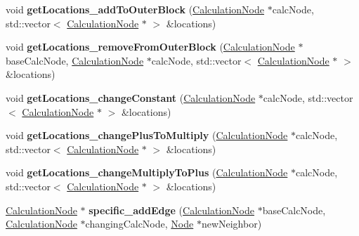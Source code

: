 \begin{DoxyCompactItemize}
\item 
void {\bfseries get\+Locations\+\_\+add\+To\+Outer\+Block} (\hyperlink{classCalculationNode}{Calculation\+Node} $\ast$calc\+Node, std\+::vector$<$ \hyperlink{classCalculationNode}{Calculation\+Node} $\ast$ $>$ \&locations)\hypertarget{classNetworkModifier_ac082b11da7cb452b9047eea94b0f1e37}{}\label{classNetworkModifier_ac082b11da7cb452b9047eea94b0f1e37}

\item 
void {\bfseries get\+Locations\+\_\+remove\+From\+Outer\+Block} (\hyperlink{classCalculationNode}{Calculation\+Node} $\ast$base\+Calc\+Node, \hyperlink{classCalculationNode}{Calculation\+Node} $\ast$calc\+Node, std\+::vector$<$ \hyperlink{classCalculationNode}{Calculation\+Node} $\ast$ $>$ \&locations)\hypertarget{classNetworkModifier_afe88d2366b6e5464b3e29a19fa1eeb1e}{}\label{classNetworkModifier_afe88d2366b6e5464b3e29a19fa1eeb1e}

\item 
void {\bfseries get\+Locations\+\_\+change\+Constant} (\hyperlink{classCalculationNode}{Calculation\+Node} $\ast$calc\+Node, std\+::vector$<$ \hyperlink{classCalculationNode}{Calculation\+Node} $\ast$ $>$ \&locations)\hypertarget{classNetworkModifier_a92f84a858a92dcd68e4ea252ea65f5a0}{}\label{classNetworkModifier_a92f84a858a92dcd68e4ea252ea65f5a0}

\item 
void {\bfseries get\+Locations\+\_\+change\+Plus\+To\+Multiply} (\hyperlink{classCalculationNode}{Calculation\+Node} $\ast$calc\+Node, std\+::vector$<$ \hyperlink{classCalculationNode}{Calculation\+Node} $\ast$ $>$ \&locations)\hypertarget{classNetworkModifier_a610cc380e39e047cdd2f716c75a657df}{}\label{classNetworkModifier_a610cc380e39e047cdd2f716c75a657df}

\item 
void {\bfseries get\+Locations\+\_\+change\+Multiply\+To\+Plus} (\hyperlink{classCalculationNode}{Calculation\+Node} $\ast$calc\+Node, std\+::vector$<$ \hyperlink{classCalculationNode}{Calculation\+Node} $\ast$ $>$ \&locations)\hypertarget{classNetworkModifier_ac396b8a961cd134496feb28b04f4a2ff}{}\label{classNetworkModifier_ac396b8a961cd134496feb28b04f4a2ff}

\item 
\hyperlink{classCalculationNode}{Calculation\+Node} $\ast$ {\bfseries specific\+\_\+add\+Edge} (\hyperlink{classCalculationNode}{Calculation\+Node} $\ast$base\+Calc\+Node, \hyperlink{classCalculationNode}{Calculation\+Node} $\ast$changing\+Calc\+Node, \hyperlink{classNode}{Node} $\ast$new\+Neighbor)\hypertarget{classNetworkModifier_a3e37a7d3d65e0162f2713da90a4a816a}{}\label{classNetworkModifier_a3e37a7d3d65e0162f2713da90a4a816a}


\end{DoxyCompactItemize}
